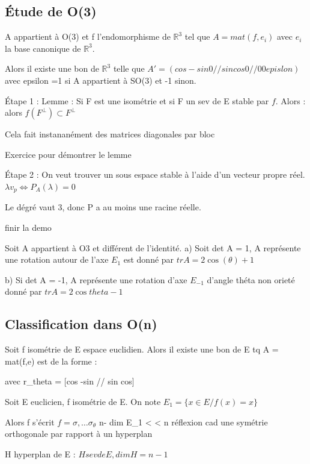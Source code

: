 \documentclass[french]{yLectureNote}
\newcommand{\R}[0]{\mathbb{R}}
\begin{document}
\subsection{Étude de O(3)}
\begin{proposition}
    A appartient à O(3) et f l'endomorphisme de $\R^3$ tel que $A = mat(f,e_i)$ avec $e_i$ la base canonique de $\R^3$.

    Alors il existe une bon de $\R^3$ telle que  $A' = (cos -sin 0//sin cos 0//0 0 epislon)$
    avec epsilon =1 si A appartient à SO(3) et -1 sinon.
\end{proposition}
\begin{myproof}
    Étape 1 : Lemme : Si F est une isométrie et si F un sev de E stable par $f$. Alors :
    alors $f(F^{\perp})\subset F^{\perp}$

    Cela fait instananément des matrices diagonales par bloc

    Exercice pour démontrer le lemme

    Étape 2 : On veut trouver un sous espace stable à l'aide d'un vecteur propre réel.
    $\lambda v_p \iff P_A(\lambda) = 0$

    Le dégré vaut 3, donc P a au moins une racine réelle.

    finir la demo
\end{myproof}
\begin{proposition}
    Soit A appartient à O3 et différent de l'identité.
    a) Soit det A = 1, A représente une rotation autour de l'axe $E_1$ est donné par $tr A = 2\cos(\theta)+1$
    
    b) Si det A = -1, A représente une rotation d'axe $E_{-1}$ d'angle théta non orieté donné par $tr A = 2\cos theta -1$
\end{proposition}
\subsection{Classification dans O(n)}
\begin{theorem}
    Soit f isométrie de E espace euclidien. Alors il existe une bon de E tq A  = mat(f,e) est de la forme :

    avec r_theta = [cos -sin // sin cos]
\end{theorem}
\begin{theorem}
    Soit E euclicien, f isométrie de E. On note $E_1 = \{x\in E/ f(x) = x\}$

    Alors f s'écrit $f = \sigma,\dots \sigma_\theta$
    n- dim E_1 < \sigma < n
    \sigma réflexion cad une symétrie orthogonale par rapport à un hyperplan
\end{theorem}
H hyperplan de E : $H sev de E, dim H  = n-1$
\end{document}
